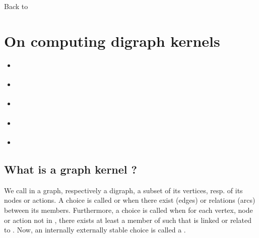 \documentclass[a4paper,12pt,english]{sphinxhowto}
\begin{document}
Back to {\hyperref[\detokenize{tutorial:tutorial-label}]{}}


\section{On computing digraph kernels}
\label{\detokenize{tutorial:on-computing-digraph-kernels}}\label{\detokenize{tutorial:kernel-tutorial-label}}
\begin{sphinxShadowBox}
\begin{itemize}
\item {} 
\label{\detokenize{tutorial:id224}}{\hyperref[\detokenize{tutorial:what-is-a-graph-kernel}]{}}

\item {} 
\label{\detokenize{tutorial:id225}}{\hyperref[\detokenize{tutorial:initial-and-terminal-kernels}]{}}

\item {} 
\label{\detokenize{tutorial:id226}}{\hyperref[\detokenize{tutorial:kernels-in-lateralized-digraphs}]{}}

\item {} 
\label{\detokenize{tutorial:id227}}{\hyperref[\detokenize{tutorial:computing-good-and-bad-choice-recommendations}]{}}

\item {} 
\label{\detokenize{tutorial:id228}}{\hyperref[\detokenize{tutorial:tractability}]{}}

\end{itemize}
\end{sphinxShadowBox}


\subsection{What is a graph kernel ?}
\label{\detokenize{tutorial:what-is-a-graph-kernel}}
We call  in a graph, respectively a digraph, a subset of its vertices, resp. of its nodes or actions. A choice  is called  or  when there exist  (edges) or relations (arcs) between its members. Furthermore, a choice  is called  when for each vertex, node or action  not in , there exists at least a member  of  such that  is linked or related to . Now, an internally  externally stable choice is called a .
\end{document}

